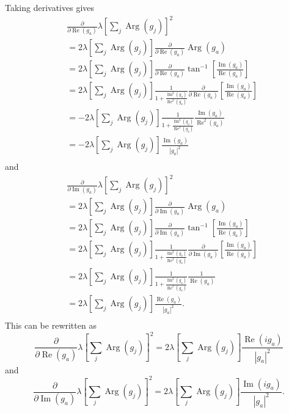 \documentclass{article}
\newcommand\re{\operatorname{Re}}
\newcommand\im{\operatorname{Im}}
\begin{document}
Taking derivatives gives
\begin{align}
    &\frac{\partial}
    {\partial \re(g_a)} \lambda \left[ \sum_j \operatorname{Arg}(g_j) \right]^2 \\
    &= 2 \lambda \left[ \sum_j \operatorname{Arg}(g_j) \right] \frac{\partial}
    {\partial \re(g_a)} \operatorname{Arg}(g_a) \\
    &= 2 \lambda \left[ \sum_j \operatorname{Arg}(g_j) \right] \frac{\partial}
    {\partial \re(g_a)} \tan^{-1} \left[ \frac{\im(g_a)}{\re(g_a)} \right] \\
    &= 2 \lambda \left[ \sum_j \operatorname{Arg}(g_j) \right] \frac{1}{1+\frac{\im^2(g_a)}{\re^2(g_a)}} \frac{\partial}
    {\partial \re(g_a)} \left[ \frac{\im(g_a)}{\re(g_a)} \right] \\
    &= -2 \lambda \left[ \sum_j \operatorname{Arg}(g_j) \right] \frac{1}{1+\frac{\im^2(g_a)}{\re^2(g_a)}} \frac{\im(g_a)}{\re^2(g_a)} \\
    &= -2 \lambda \left[ \sum_j \operatorname{Arg}(g_j) \right] \frac{\im(g_a)}{|g_a|^2} \\
\end{align}
and
\begin{align}
    &\frac{\partial}
    {\partial \im(g_a)} \lambda \left[ \sum_j \operatorname{Arg}(g_j) \right]^2 \\
    &= 2 \lambda \left[ \sum_j \operatorname{Arg}(g_j) \right] \frac{\partial}
    {\partial \im(g_a)} \operatorname{Arg}(g_a) \\
    &= 2 \lambda \left[ \sum_j \operatorname{Arg}(g_j) \right] \frac{\partial}
    {\partial \im(g_a)} \tan^{-1} \left[ \frac{\im(g_a)}{\re(g_a)} \right] \\
    &= 2 \lambda \left[ \sum_j \operatorname{Arg}(g_j) \right] \frac{1}{1+\frac{\im^2(g_a)}{\re^2(g_a)}} \frac{\partial}
    {\partial \im(g_a)} \left[ \frac{\im(g_a)}{\re(g_a)} \right] \\
    &= 2 \lambda \left[ \sum_j \operatorname{Arg}(g_j) \right] \frac{1}{1+\frac{\im^2(g_a)}{\re^2(g_a)}} \frac{1}{\re(g_a)} \\
    &= 2 \lambda \left[ \sum_j \operatorname{Arg}(g_j) \right] \frac{\re(g_a)}{|g_a|^2}. \\
\end{align}
This can be rewritten as
\begin{equation}
\frac{\partial}{\partial \re(g_a)} \lambda \left[ \sum_j \operatorname{Arg}(g_j) \right]^2 = 2 \lambda \left[ \sum_j \operatorname{Arg}(g_j) \right] \frac{\re(i g_a)}{|g_a|^2}
\end{equation}
and
\begin{equation}
\frac{\partial}{\partial \im(g_a)} \lambda \left[ \sum_j \operatorname{Arg}(g_j) \right]^2 = 2 \lambda \left[ \sum_j \operatorname{Arg}(g_j) \right] \frac{\im(i g_a)}{|g_a|^2}.
\end{equation}
\end{document}
